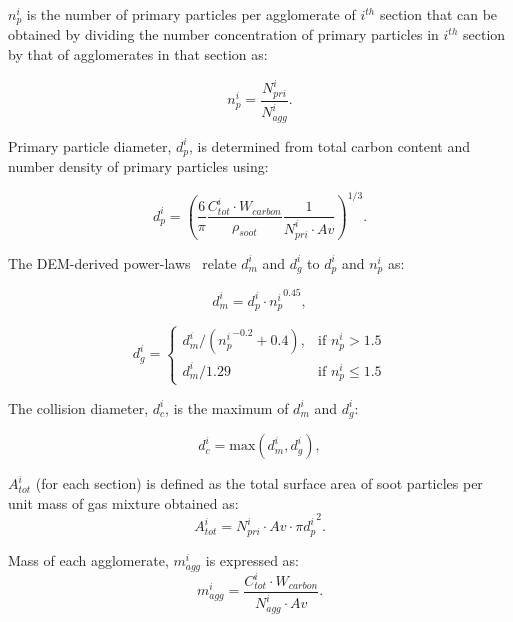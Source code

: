 ${n^i_p}$ is the number of primary particles per agglomerate of ${i^{th}}$ section that can be obtained by dividing the number concentration of primary particles in ${i^{th}}$ section by that of agglomerates in that section as:

\begin{equation}
	n^i_p = \frac{N^i_{pri}}{N^i_{agg}}
	\label{eqn:n_p}.
\end{equation}

Primary particle diameter, ${d^i_p}$, is determined from total carbon content and number density of primary particles using:

\begin{equation}
	d^i_p = \left(\frac{6}{\pi} \frac{C^i_{tot}\cdot W_{carbon}}{\rho_{soot}} \frac{1}{N^i_{pri}\cdot Av} \right)^{1/3}.
	\label{eqn:d_p}
\end{equation}

The DEM-derived power-laws~\citep{Kelesidis2017} relate ${d^i_m}$ and ${d^i_g}$ to ${d^i_p}$ and ${n^i_p}$ as:

\begin{equation}
	d^i_{m} = d^i_p\cdot {n^i_p}^{0.45}
	\label{eqn:d_m},
\end{equation}

\begin{equation}
	d^i_g = 
	\left\{
	\begin{array}{lr}
		d^i_m/({n^i_p}^{-0.2}+0.4), & \text{if } n^i_p > 1.5\\
		d^i_m/1.29 & \text{if } n^i_p\leq 1.5
	\end{array}
	\right.
	\label{eqn:d_g}
\end{equation}

The collision diameter, ${d^i_c}$, is the maximum of ${d^i_{m}}$ and ${d^i_{g}}$:

\begin{equation}
	d^i_c = \mathrm{max}\left(d^i_m, d^i_g\right),
	\label{eqn:d_c}
\end{equation}

$A^i_{tot}$ (for each section) is defined as the total surface area of soot particles per unit mass of gas mixture obtained as:
\begin{equation}
	A^i_{tot} = N^i_{pri}\cdot Av\cdot \pi {d^i_p}^2
	\label{eqn:Atot}.
\end{equation}

Mass of each agglomerate, $m^i_{agg}$ is expressed as:
\begin{equation}
	m^i_{agg} = \frac{C^i_{tot}\cdot W_{carbon}}{N^i_{agg}\cdot Av}.
	\label{eqn:m_agg}
\end{equation}





